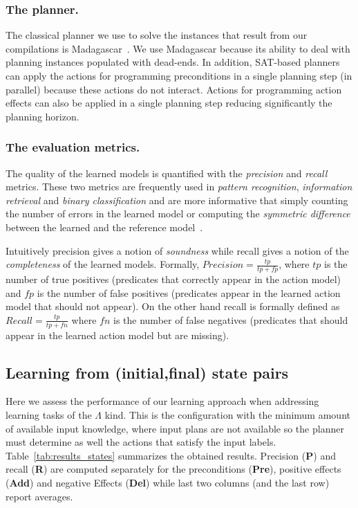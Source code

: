 \documentclass[letterpaper]{article} %
\begin{document}
\subsubsection{The planner.}
The classical planner we use to solve the instances that result from our compilations is {\sc Madagascar}~\cite{rintanen2014madagascar}. We use {\sc Madagascar} because its ability to deal with planning instances populated with dead-ends. In addition, SAT-based planners can apply the actions for programming preconditions in a single planning step (in parallel) because these actions do not interact. Actions for programming action effects can also be applied in a single planning step reducing significantly the planning horizon.

\subsubsection{The evaluation metrics.}
The quality of the learned models is quantified with the {\em precision} and {\em recall} metrics. These two metrics are frequently used in {\em pattern recognition}, {\em information retrieval} and {\em binary classification} and are more informative that simply counting the number of errors in the learned model or computing the {\em symmetric difference} between the learned and the reference model~\cite{davis2006relationship}.

Intuitively precision gives a notion of {\em soundness} while recall gives a notion of the {\em completeness} of the learned models. Formally, $Precision=\frac{tp}{tp+fp}$, where $tp$ is the number of true positives (predicates that correctly appear in the action model) and $fp$ is the number of false positives (predicates appear in the learned action model that should not appear). On the other hand recall is formally defined as $Recall=\frac{tp}{tp+fn}$ where $fn$ is the number of false negatives (predicates that should appear in the learned action model but are missing).

\subsection{Learning from (initial,final) state pairs}
Here we assess the performance of our learning approach when addressing learning tasks of the $\Lambda$ kind. This is the configuration with the minimum amount of available input knowledge, where input plans are not available so the planner must determine as well the actions that satisfy the input labels. Table~\ref{tab:results_states} summarizes the obtained results. Precision ({\bf P}) and recall ({\bf R}) are computed separately for the preconditions ({\bf Pre}), positive effects ({\bf Add}) and negative Effects ({\bf Del}) while last two columns (and the last row) report averages. 
\end{document}
